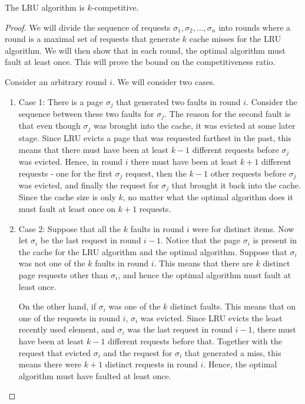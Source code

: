 \begin{theorem}
	The LRU algorithm is $k$-competitive.
	\label{thm:paging-det-ub}
\end{theorem}
\begin{proof}
	We will divide the sequence of requests $\sigma_1,\sigma_2,\ldots,\sigma_n$ into rounds where a round is a maximal set of requests that generate $k$ cache misses for the LRU algorithm. We will then show that in each round, the optimal algorithm must fault at least once. This will prove the bound on the competitiveness ratio.
	
	Consider an arbitrary round $i$. We will consider two cases.
	\begin{enumerate}
		\item Case 1: There is a page $\sigma_j$ that generated two faults in round $i$. Consider the sequence between these two faults for $\sigma_j$. The reason for the second fault is that even though $\sigma_j$ was brought into the cache, it was evicted at some later stage. Since LRU evicts a page that was requested farthest in the past, this means that there must have been at least $k-1$ different requests before $\sigma_j$ was evicted. Hence, in round $i$ there must have been at least $k+1$ different requests - one for the first $\sigma_j$ request, then the $k-1$ other requests before $\sigma_j$ was evicted, and finally the request for $\sigma_j$ that brought it back into the cache. Since the cache size is only $k$, no matter what the optimal algorithm does it must fault at least once on $k+1$ requests.
		\item Case 2: Suppose that all the $k$ faults in round $i$ were for distinct items. Now let $\sigma_i$ be the last request in round $i-1$. Notice that the page $\sigma_i$ is present in the cache for the LRU algorithm and the optimal algorithm. Suppose that $\sigma_i$ was not one of the $k$ faults in round $i$. This means that there are $k$ distinct page requests other than $\sigma_i$, and hence the optimal algorithm must fault at least once. 
		
		On the other hand, if $\sigma_i$ was one of the $k$ distinct faults. This means that on one of the requests in round $i$, $\sigma_i$ was evicted. Since LRU evicts the least recently used element, and $\sigma_i$ was the last request in round $i-1$, there must have been at least $k-1$ different requests before that. Together with the request that evicted $\sigma_i$ and the request for $\sigma_i$ that generated a miss, this means there were $k+1$ distinct requests in round $i$. Hence, the optimal algorithm must have faulted at least once.
	\end{enumerate}
\end{proof}

